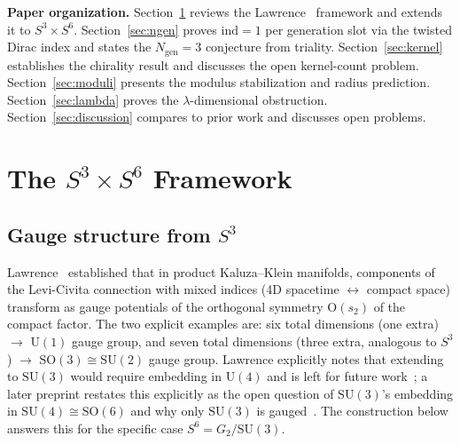 \documentclass[12pt,a4paper]{article}
\newcommand{\ind}{\mathrm{ind}}
\begin{document}
\textbf{Paper organization.} Section~\ref{sec:framework} reviews the Lawrence~\cite{Lawrence2022}
framework and extends it to $S^3\times S^6$. Section~\ref{sec:ngen} proves $\ind=1$ per generation slot via the twisted Dirac index
and states the $N_{\mathrm{gen}}=3$ conjecture from triality.
Section~\ref{sec:kernel} establishes the chirality result and discusses the open
kernel-count problem. Section~\ref{sec:moduli} presents the modulus stabilization and radius prediction.
Section~\ref{sec:lambda} proves the $\lambda$-dimensional obstruction. Section~\ref{sec:discussion}
compares to prior work and discusses open problems.

\section{The \texorpdfstring{$S^3\times S^6$}{S3 x S6} Framework}
\label{sec:framework}

\subsection{Gauge structure from \texorpdfstring{$S^3$}{S3}}
\label{sec:gauge-S3}

Lawrence~\cite{Lawrence2022} established that in product Kaluza--Klein manifolds,
components of the Levi-Civita connection with mixed indices (4D spacetime $\leftrightarrow$
compact space) transform as gauge potentials of the orthogonal symmetry $\mathrm{O}(s_2)$
of the compact factor. The two explicit examples are: six total dimensions (one extra)
$\to$ $\mathrm{U}(1)$ gauge group, and seven total dimensions (three extra, analogous to $S^3$)
$\to$ $\mathrm{SO}(3)\cong\mathrm{SU}(2)$ gauge group. Lawrence explicitly notes that
extending to $\mathrm{SU}(3)$ would require embedding in $\mathrm{U}(4)$ and is left for
future work~\cite{Lawrence2022}; a later preprint restates this explicitly as the open
question of $\mathrm{SU}(3)$'s embedding in $\mathrm{SU}(4)\cong\mathrm{SO}(6)$ and why
only $\mathrm{SU}(3)$ is gauged~\cite{Lawrence2023}. The construction below answers this
for the specific case $S^6=G_2/\mathrm{SU}(3)$.
\end{document}
